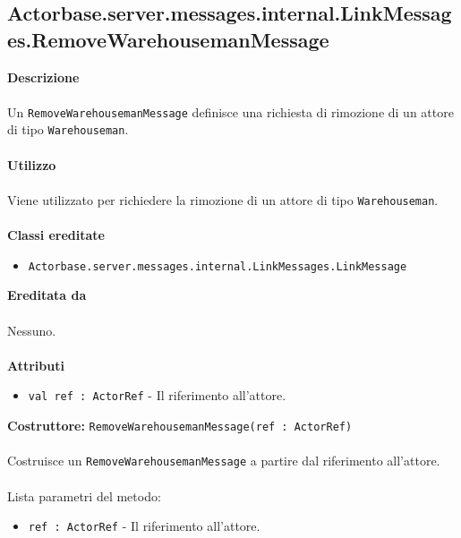 \documentclass[a4paper]{article}
\begin{document}
	\subsection{Actorbase.server.messages.internal.LinkMessages.RemoveWarehousemanMessage}
		\textbf{Descrizione}
			\\ \\
			Un \texttt{RemoveWarehousemanMessage} definisce una richiesta di rimozione di un attore di tipo \texttt{Warehouseman}.
			\\ \\
		\textbf{Utilizzo}
			\\ \\
			Viene utilizzato per richiedere la rimozione di un attore di tipo \texttt{Warehouseman}.
			\\ \\
		\textbf{Classi ereditate}
			\begin{itemize}
				\item \texttt{Actorbase.server.messages.internal.LinkMessages.LinkMessage}
			\end{itemize}
		\textbf{Ereditata da}
			\\ \\
			Nessuno.
			\\ \\
		\textbf{Attributi}
			\begin{itemize}
				\item \texttt{val ref : ActorRef} - Il riferimento all'attore.
			\end{itemize}
		\textbf{Costruttore:} \texttt{RemoveWarehousemanMessage(ref : ActorRef)}
		\\ \\
		Costruisce un \texttt{RemoveWarehousemanMessage} a partire dal riferimento all'attore.
		\\ \\
		Lista parametri del metodo:
			\begin{itemize}
				\item \texttt{ref : ActorRef} - Il riferimento all'attore.
			\end{itemize}
			
\end{document}
